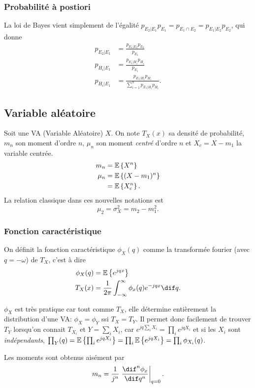 \subsubsection{Probabilité à postiori}
La loi de Bayes vient simplement de l'égalité $p_{E_2|E_1} p_{E_1} = p_{E_1 \cap E_2} = p_{E_1|E_2} p_{E_2}$, qui donne
\begin{align*}
  p_{E_2|E_1} & = \frac{p_{E_1|E_2}p_{E_2}}{p_{E_1}}\\
  p_{H_i|E_1} & = \frac{p_{E_1|H_i}p_{H_i}}{p_{E_1}}\\
  p_{H_i|E_1} & = \frac{p_{E_1|H_i}p_{H_i}}{\sum_{i=1}^n p_{E_1|H_i} p_{H_i}}.
\end{align*}

\subsection{Variable aléatoire}
Soit une VA (Variable Aléatoire) $X$.
On note $T_X(x)$ sa densité de probabilité,
$m_n$ son moment d'ordre $n$, $\mu_n$ son moment \emph{centré} d'ordre $n$
et $X_c = X - m_1$ la variable centrée.
\begin{align*}
  m_n   & = \mathbb{E}\left\{X^n\right\}\\
  \mu_n & = \mathbb{E}\left\{(X - m_1)^n\right\}\\
        & = \mathbb{E}\left\{X_c^n\right\}.
\end{align*}
La relation classique dans ces nouvelles notations est
\[
  \mu_2 = \sigma_X^2 = m_2 - m_1^2.
\]

\subsubsection{Fonction caractéristique}
On définit la fonction caractéristique $\phi_X(q)$ comme la transformée fourier
(avec $q = -\omega$) de $T_X$, c'est à dire
\begin{align*}
  \phi_X(q) & = \Ex{e^{jqx}}\\
  T_X(x) & = \frac{1}{2\pi} \int_{-\infty}^{\infty} \phi_x(q) e^{-jqx} \dif q.
\end{align*}

$\phi_X$ est très pratique car tout comme $T_X$, elle détermine
entièrement la distribution d'une VA: $\phi_X = \phi_Y$ ssi $T_X = T_Y$.
Il permet donc facilement de trouver $T_Y$ lorsqu'on connait $T_{X_i}$ et $Y = \sum_i X_i$,
car $e^{jq\sum_i X_i} = \prod_i e^{jqX_i}$ et si les $X_i$ sont \emph{indépendants},
$\prod_Y(q) = \mathbb{E}\left\{\prod_i e^{jqX_i}\right\} = \prod_i \mathbb{E}\left\{e^{jqX_i}\right\} = \prod_i \phi_{X_i}(q)$.

Les moments sont obtenus aisément par
\[ m_n = \frac{1}{j^n} \left.\frac{\dif^n \phi_x}{\dif q^n}\right|_{q = 0}. \]

